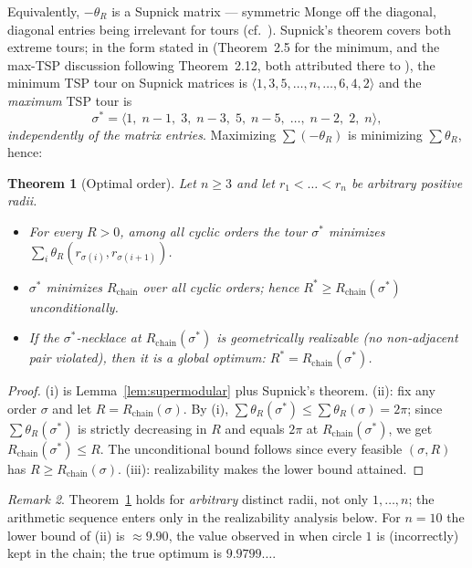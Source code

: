 \documentclass[11pt]{article}
\newtheorem{theorem}{Theorem}
\theoremstyle{definition}
\theoremstyle{remark}
\newtheorem{remark}[theorem]{Remark}
\begin{document}
Equivalently, $-\theta_R$ is a Supnick matrix --- symmetric Monge off the diagonal, diagonal entries being irrelevant for tours (cf.\ \cite[Prop.~2.13]{bdvvw}). Supnick's theorem \cite{supnick} covers both extreme tours; in the form stated in \cite{bdvvw} (Theorem~2.5 for the minimum, and the max-TSP discussion following Theorem~2.12, both attributed there to \cite{supnick}), the minimum TSP tour on Supnick matrices is $\langle 1,3,5,\dots,n,\dots,6,4,2\rangle$ and the \emph{maximum} TSP tour is
\[
\sigma^\ast=\langle 1,\; n-1,\; 3,\; n-3,\; 5,\; n-5,\;\dots,\; n-2,\; 2,\; n\rangle,
\]
\emph{independently of the matrix entries}. Maximizing $\sum(-\theta_R)$ is minimizing $\sum\theta_R$, hence:

\begin{theorem}[Optimal order]\label{thm:A}
Let $n\ge3$ and let $r_1<\dots<r_n$ be arbitrary positive radii.
\begin{itemize}
\item[(i)] For every $R>0$, among all cyclic orders the tour $\sigma^\ast$ minimizes $\sum_i\theta_R(r_{\sigma(i)},r_{\sigma(i+1)})$.
\item[(ii)] $\sigma^\ast$ minimizes $R_{\mathrm{chain}}$ over all cyclic orders; hence $R^\ast\ge R_{\mathrm{chain}}(\sigma^\ast)$ unconditionally.
\item[(iii)] If the $\sigma^\ast$-necklace at $R_{\mathrm{chain}}(\sigma^\ast)$ is geometrically realizable (no non-adjacent pair violated), then it is a global optimum: $R^\ast=R_{\mathrm{chain}}(\sigma^\ast)$.
\end{itemize}
\end{theorem}

\begin{proof}
(i) is Lemma~\ref{lem:supermodular} plus Supnick's theorem. (ii): fix any order $\sigma$ and let $R=R_{\mathrm{chain}}(\sigma)$. By (i), $\sum\theta_{R}(\sigma^\ast)\le\sum\theta_{R}(\sigma)=2\pi$; since $\sum\theta_R(\sigma^\ast)$ is strictly decreasing in $R$ and equals $2\pi$ at $R_{\mathrm{chain}}(\sigma^\ast)$, we get $R_{\mathrm{chain}}(\sigma^\ast)\le R$. The unconditional bound follows since every feasible $(\sigma,R)$ has $R\ge R_{\mathrm{chain}}(\sigma)$. (iii): realizability makes the lower bound attained.
\end{proof}

\begin{remark}
Theorem~\ref{thm:A} holds for \emph{arbitrary} distinct radii, not only $1,\dots,n$; the arithmetic sequence enters only in the realizability analysis below. For $n=10$ the lower bound of (ii) is $\approx 9.90$, the value observed in \cite{mse} when circle $1$ is (incorrectly) kept in the chain; the true optimum is $9.9799\ldots$.
\end{remark}
\end{document}
